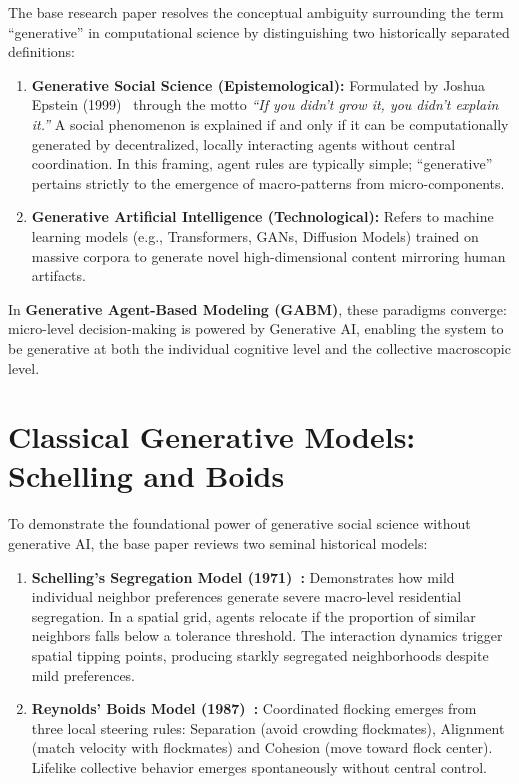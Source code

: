 \documentclass[12pt,a4paper]{report}
\begin{document}
The base research paper resolves the conceptual ambiguity surrounding the term ``generative'' in computational science by distinguishing two historically separated definitions:

\begin{enumerate}[label=\arabic*.]
    \item \textbf{Generative Social Science (Epistemological):} Formulated by Joshua Epstein (1999)~\cite{epstein1999generative} through the motto \textit{``If you didn't grow it, you didn't explain it.''} A social phenomenon is explained if and only if it can be computationally generated by decentralized, locally interacting agents without central coordination. In this framing, agent rules are typically simple; ``generative'' pertains strictly to the emergence of macro-patterns from micro-components.
    \item \textbf{Generative Artificial Intelligence (Technological):} Refers to machine learning models (e.g., Transformers, GANs, Diffusion Models) trained on massive corpora to generate novel high-dimensional content mirroring human artifacts.
\end{enumerate}

In \textbf{Generative Agent-Based Modeling (GABM)}, these paradigms converge: micro-level decision-making is powered by Generative AI, enabling the system to be generative at both the individual cognitive level and the collective macroscopic level.

\section{Classical Generative Models: Schelling and Boids}
\label{sec:classic_models}

To demonstrate the foundational power of generative social science without generative AI, the base paper reviews two seminal historical models:
\begin{enumerate}[label=\arabic*.]
    \item \textbf{Schelling's Segregation Model (1971)~\cite{schelling1971dynamic}:} Demonstrates how mild individual neighbor preferences generate severe macro-level residential segregation. In a spatial grid, agents relocate if the proportion of similar neighbors falls below a tolerance threshold. The interaction dynamics trigger spatial tipping points, producing starkly segregated neighborhoods despite mild preferences.
    \item \textbf{Reynolds' Boids Model (1987)~\cite{reynolds1987flocks}:} Coordinated flocking emerges from three local steering rules: Separation (avoid crowding flockmates), Alignment (match velocity with flockmates) and Cohesion (move toward flock center). Lifelike collective behavior emerges spontaneously without central control.
\end{enumerate}
\end{document}
